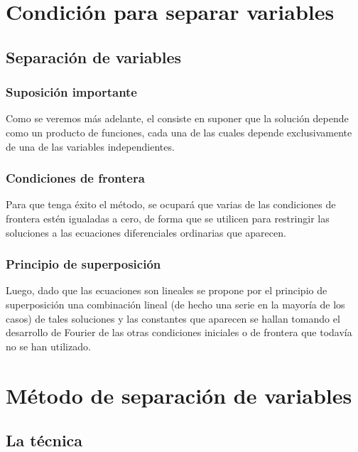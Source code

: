 \documentclass[12pt]{beamer}
\begin{document}
\section{Condición para separar variables}
\subsection{Separación de variables}

\begin{frame}
\frametitle{Suposición importante}
Como se veremos más adelante, el  consiste en suponer que la solución depende como un producto de funciones, cada una de las cuales depende exclusivamente de una de las variables independientes.
\end{frame}
\begin{frame}
\frametitle{Condiciones de frontera}
Para que tenga éxito el método, se ocupará que varias de las condiciones de frontera estén igualadas a cero, de forma que se utilicen para restringir las soluciones a las ecuaciones diferenciales ordinarias que aparecen.
\end{frame}
\begin{frame}
\frametitle{Principio de superposición}
Luego, dado que las ecuaciones son lineales se propone por el principio de superposición una combinación lineal (de hecho una serie en la mayoría de los casos) de tales soluciones \pause y las constantes que aparecen se hallan tomando el desarrollo de Fourier de las otras condiciones iniciales o de frontera que todavía no se han utilizado.
\end{frame}

\section{Método de separación de variables}
\subsection{La técnica}
\end{document}
